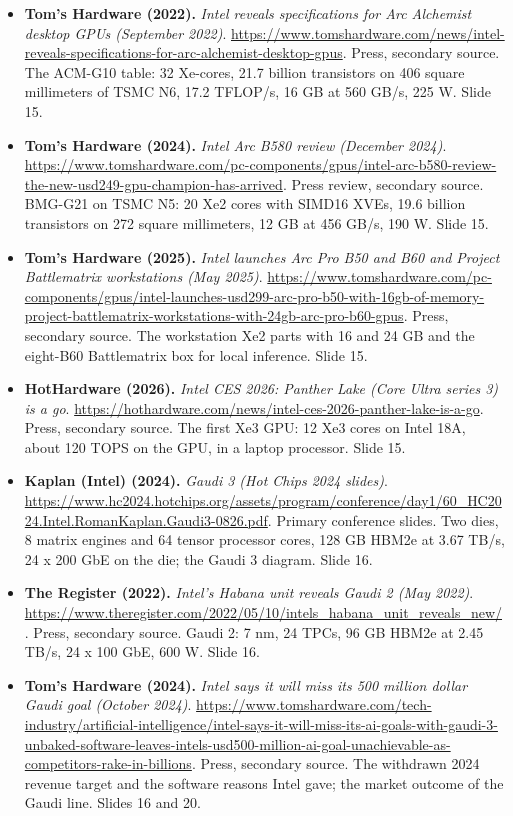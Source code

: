 \documentclass[11pt,letterpaper]{article}
\begin{document}
\begin{itemize}[leftmargin=1.2em,itemsep=3pt]
\item \textbf{Tom's Hardware (2022).} \textit{Intel reveals specifications for Arc Alchemist desktop GPUs (September 2022)}. \url{https://www.tomshardware.com/news/intel-reveals-specifications-for-arc-alchemist-desktop-gpus}. Press, secondary source. The ACM-G10 table: 32 Xe-cores, 21.7 billion transistors on 406 square millimeters of TSMC N6, 17.2 TFLOP/s, 16 GB at 560 GB/s, 225 W. Slide 15.
\item \textbf{Tom's Hardware (2024).} \textit{Intel Arc B580 review (December 2024)}. \url{https://www.tomshardware.com/pc-components/gpus/intel-arc-b580-review-the-new-usd249-gpu-champion-has-arrived}. Press review, secondary source. BMG-G21 on TSMC N5: 20 Xe2 cores with SIMD16 XVEs, 19.6 billion transistors on 272 square millimeters, 12 GB at 456 GB/s, 190 W. Slide 15.
\item \textbf{Tom's Hardware (2025).} \textit{Intel launches Arc Pro B50 and B60 and Project Battlematrix workstations (May 2025)}. \url{https://www.tomshardware.com/pc-components/gpus/intel-launches-usd299-arc-pro-b50-with-16gb-of-memory-project-battlematrix-workstations-with-24gb-arc-pro-b60-gpus}. Press, secondary source. The workstation Xe2 parts with 16 and 24 GB and the eight-B60 Battlematrix box for local inference. Slide 15.
\item \textbf{HotHardware (2026).} \textit{Intel CES 2026: Panther Lake (Core Ultra series 3) is a go}. \url{https://hothardware.com/news/intel-ces-2026-panther-lake-is-a-go}. Press, secondary source. The first Xe3 GPU: 12 Xe3 cores on Intel 18A, about 120 TOPS on the GPU, in a laptop processor. Slide 15.
\item \textbf{Kaplan (Intel) (2024).} \textit{Gaudi 3 (Hot Chips 2024 slides)}. \url{https://www.hc2024.hotchips.org/assets/program/conference/day1/60_HC2024.Intel.RomanKaplan.Gaudi3-0826.pdf}. Primary conference slides. Two dies, 8 matrix engines and 64 tensor processor cores, 128 GB HBM2e at 3.67 TB/s, 24 x 200 GbE on the die; the Gaudi 3 diagram. Slide 16.
\item \textbf{The Register (2022).} \textit{Intel's Habana unit reveals Gaudi 2 (May 2022)}. \url{https://www.theregister.com/2022/05/10/intels_habana_unit_reveals_new/}. Press, secondary source. Gaudi 2: 7 nm, 24 TPCs, 96 GB HBM2e at 2.45 TB/s, 24 x 100 GbE, 600 W. Slide 16.
\item \textbf{Tom's Hardware (2024).} \textit{Intel says it will miss its 500 million dollar Gaudi goal (October 2024)}. \url{https://www.tomshardware.com/tech-industry/artificial-intelligence/intel-says-it-will-miss-its-ai-goals-with-gaudi-3-unbaked-software-leaves-intels-usd500-million-ai-goal-unachievable-as-competitors-rake-in-billions}. Press, secondary source. The withdrawn 2024 revenue target and the software reasons Intel gave; the market outcome of the Gaudi line. Slides 16 and 20.
\end{itemize}
\end{document}
